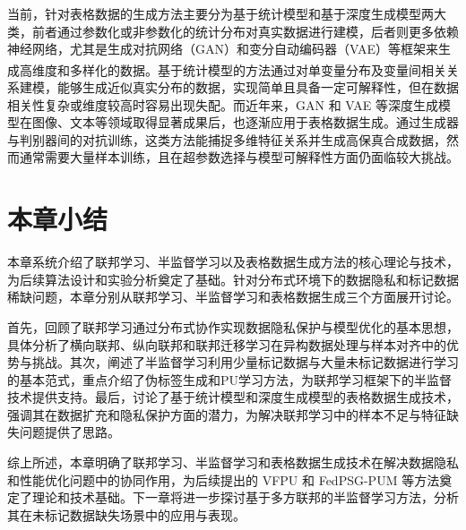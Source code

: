 当前，针对表格数据的生成方法主要分为基于统计模型和基于深度生成模型两大类，前者通过参数化或非参数化的统计分布对真实数据进行建模，后者则更多依赖神经网络，尤其是生成对抗网络（GAN）和变分自动编码器（VAE）等框架来生成高维度和多样化的数据\textsuperscript{\cite{brown2019differential}}。基于统计模型的方法通过对单变量分布及变量间相关关系建模，能够生成近似真实分布的数据，实现简单且具备一定可解释性，但在数据相关性复杂或维度较高时容易出现失配。而近年来，GAN 和 VAE 等深度生成模型在图像、文本等领域取得显著成果后，也逐渐应用于表格数据生成。通过生成器与判别器间的对抗训练，这类方法能捕捉多维特征关系并生成高保真合成数据，然而通常需要大量样本训练，且在超参数选择与模型可解释性方面仍面临较大挑战。

\section{本章小结}
本章系统介绍了联邦学习、半监督学习以及表格数据生成方法的核心理论与技术，为后续算法设计和实验分析奠定了基础。针对分布式环境下的数据隐私和标记数据稀缺问题，本章分别从联邦学习、半监督学习和表格数据生成三个方面展开讨论。

首先，回顾了联邦学习通过分布式协作实现数据隐私保护与模型优化的基本思想，具体分析了横向联邦、纵向联邦和联邦迁移学习在异构数据处理与样本对齐中的优势与挑战。其次，阐述了半监督学习利用少量标记数据与大量未标记数据进行学习的基本范式，重点介绍了伪标签生成和PU学习方法，为联邦学习框架下的半监督技术提供支持。最后，讨论了基于统计模型和深度生成模型的表格数据生成技术，强调其在数据扩充和隐私保护方面的潜力，为解决联邦学习中的样本不足与特征缺失问题提供了思路。

综上所述，本章明确了联邦学习、半监督学习和表格数据生成技术在解决数据隐私和性能优化问题中的协同作用，为后续提出的 VFPU 和 FedPSG-PUM 等方法奠定了理论和技术基础。下一章将进一步探讨基于多方联邦的半监督学习方法，分析其在未标记数据缺失场景中的应用与表现。
